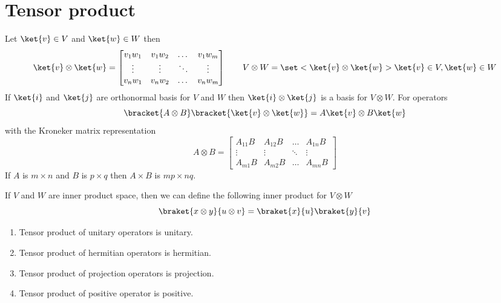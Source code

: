\section{Tensor product}
Let \(\ket{v} \in V\) and \(\ket{w} \in W\) then 
\begin{equation*}
    \ket{v} \otimes \ket{w} = \begin{bmatrix}
        v_1w_1 & v_1w_2 & \dots & v_1w_m \\
        \vdots & \vdots & \ddots & \vdots\\
        v_nw_1 & v_nw_2 & \dots & v_nw_m
    \end{bmatrix}
    \qquad V \otimes W = \set<\ket{v} \otimes \ket{w}>{\ket{v} \in V, \ket{w} \in W}
\end{equation*}
If \(\ket{i}\) and \(\ket{j}\) are orthonormal basis for \(V\) and \(W\) then \(\ket{i} \otimes \ket{j}\) is a basis for \(V \otimes W\). For operators 
\begin{equation*}
    \bracket{A \otimes B } \bracket{\ket{v} \otimes \ket{w}} = A \ket{v} \otimes B \ket{w}
\end{equation*}
with the Kroneker matrix representation
\begin{equation*}
    A \otimes B = \begin{bmatrix}
        A_{11}B & A_{12}B & \dots & A_{1n}B \\
        \vdots & \vdots & \ddots & \vdots\\
        A_{m1}B & A_{m2}B & \dots & A_{mn}B
    \end{bmatrix}
\end{equation*}
If \(A\) is \(m \times n \) and \(B\) is \(p \times q\) then \(A \times B\) is \(mp \times nq\).
\begin{proposition}
    If \(V\) and \(W\) are inner product space, then we can define the following inner product for \(V \otimes W\)
    \begin{equation*}
        \braket{x \otimes y}{u \otimes v}= \braket{x}{u} \braket{y}{v}
    \end{equation*}
\end{proposition}

\begin{proposition} \leavevmode
    \begin{enumerate}
        \item Tensor product of unitary operators is unitary.
        \item Tensor product of hermitian operators is hermitian.
        \item Tensor product of projection operators is projection.
        \item Tensor product of positive operator is positive.
    \end{enumerate}
\end{proposition}
